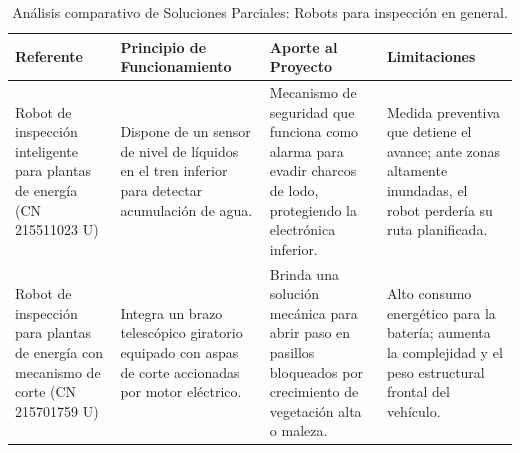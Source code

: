 \begin{table}[H]
	\centering
	\footnotesize
	\caption{Análisis comparativo de Soluciones Parciales: Robots para inspección en general.}
	\label{tab:estado_arte_robots_general}
	\begin{tabularx}{\textwidth}{|p{3.5cm}|>{\raggedright\arraybackslash}X|>{\raggedright\arraybackslash}X|>{\raggedright\arraybackslash}X|}
		\hline
		\rowcolor[HTML]{D9E1F2} 
		\textbf{Referente} & \textbf{Principio de Funcionamiento} & \textbf{Aporte al Proyecto} & \textbf{Limitaciones} \\ \hline
		Robot de inspección inteligente para plantas de energía (CN 215511023 U) & Dispone de un sensor de nivel de líquidos en el tren inferior para detectar acumulación de agua. & Mecanismo de seguridad que funciona como alarma para evadir charcos de lodo, protegiendo la electrónica inferior. & Medida preventiva que detiene el avance; ante zonas altamente inundadas, el robot perdería su ruta planificada. \\ \hline
		Robot de inspección para plantas de energía con mecanismo de corte (CN 215701759 U) & Integra un brazo telescópico giratorio equipado con aspas de corte accionadas por motor eléctrico. & Brinda una solución mecánica para abrir paso en pasillos bloqueados por crecimiento de vegetación alta o maleza. & Alto consumo energético para la batería; aumenta la complejidad y el peso estructural frontal del vehículo. \\ \hline
	\end{tabularx}
\end{table}

